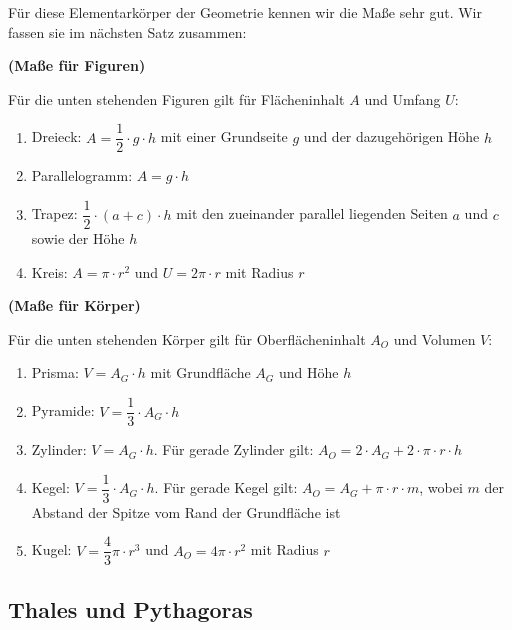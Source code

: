 \documentclass[ngerman, 12pt]{nssheetxea}
\begin{document}
Für diese Elementarkörper der Geometrie kennen wir die Maße sehr gut. Wir fassen sie im nächsten Satz zusammen:
\begin{theorem} \textbf{(Maße für Figuren)} \par
Für die unten stehenden Figuren gilt für Flächeninhalt $A$ und Umfang $U$:
\begin{enumerate}
\item Dreieck: $A=\dfrac{1}{2}\cdot g \cdot h$ mit einer Grundseite $g$ und der dazugehörigen Höhe $h$  
\item Parallelogramm: $A=g \cdot h$ 
\item Trapez: $\dfrac{1}{2}\cdot (a+c) \cdot h$ mit den zueinander parallel liegenden Seiten $a$ und $c$ sowie der Höhe $h$ 
\item Kreis: $A=\pi \cdot r^2$ und $U=2\pi \cdot r$ mit Radius $r$  
\end{enumerate}
\end{theorem}


\begin{theorem} \textbf{(Maße für Körper)} \par
Für die unten stehenden Körper gilt für Oberflächeninhalt $A_O$ und Volumen $V$:
\begin{enumerate}
\item Prisma: $V=A_G\cdot h$ mit Grundfläche $A_G$ und Höhe $h$ 
\item Pyramide: $V=\dfrac{1}{3}\cdot A_G \cdot h$ 
\item Zylinder: $V=A_G\cdot h$. Für gerade Zylinder gilt: $A_O=2\cdot A_G + 2 \cdot \pi \cdot r \cdot h$  
\item Kegel: $V=\dfrac{1}{3}\cdot A_G \cdot h$. Für gerade Kegel gilt: $A_O=A_G+\pi \cdot r\cdot m$, wobei $m$ der Abstand der Spitze vom Rand der Grundfläche ist  
\item Kugel: $V=\dfrac{4}{3}\pi \cdot r^3$ und $A_O=4\pi \cdot r^2$ mit Radius $r$  
\end{enumerate}
\end{theorem}
\newpage
\subsection{Thales und Pythagoras}
\end{document}
